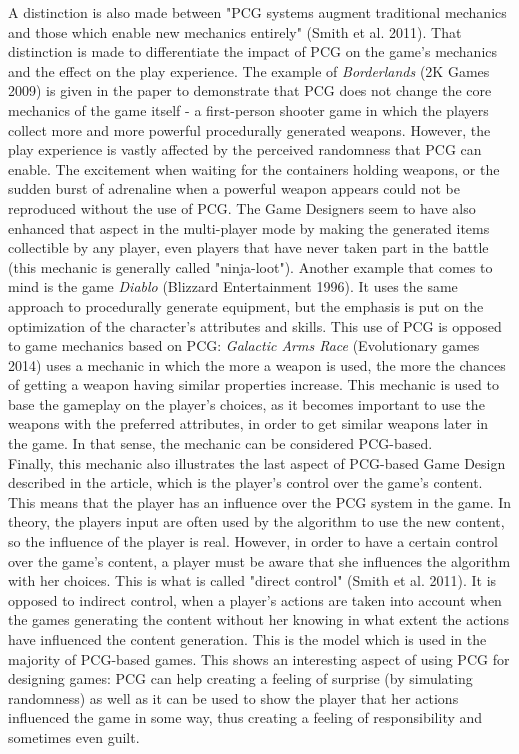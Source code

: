 A distinction is also made between "PCG systems augment traditional mechanics and those which enable new mechanics entirely" (Smith et al. 2011). That distinction is made to differentiate the impact of PCG on the game's mechanics and the effect on the play experience. The example of \textit{Borderlands} (2K Games 2009) is given in the paper to demonstrate that PCG does not change the core mechanics of the game itself - a first-person shooter game in which the players collect more and more powerful procedurally generated weapons. However, the play experience is vastly affected by the perceived randomness that PCG can enable. The excitement when waiting for the containers holding weapons, or the sudden burst of adrenaline when a powerful weapon appears could not be reproduced without the use of PCG. The Game Designers seem to have also enhanced that aspect in the multi-player mode by making the generated items collectible by any player, even players that have never taken part in the battle (this mechanic is generally called "ninja-loot"). Another example that comes to mind is the game \textit{Diablo} (Blizzard Entertainment 1996). It uses the same approach to procedurally generate equipment, but the emphasis is put on the optimization of the character's attributes and skills. This use of PCG is opposed to game mechanics based on PCG: \textit{Galactic Arms Race} (Evolutionary games 2014) uses a mechanic in which the more a weapon is used, the more the chances of getting a weapon having similar properties increase. This mechanic is used to base the gameplay on the player's choices, as it becomes important to use the weapons with the preferred attributes, in order to get similar weapons later in the game. In that sense, the mechanic can be considered PCG-based.\\
Finally, this mechanic also illustrates the last aspect of PCG-based Game Design described in the article, which is the player's control over the game's content. This means that the player has an influence over the PCG system in the game. In theory, the players input are often used by the algorithm to use the new content, so the influence of the player is real. However, in order to have a certain control over the game's content, a player must be aware that she influences the algorithm with her choices. This is what is called "direct control" (Smith et al. 2011). It is opposed to indirect control, when a player's actions are taken into account when the games generating the content without her knowing in what extent the actions have influenced the content generation. This is the model which is used in the majority of PCG-based games. This shows an interesting aspect of using PCG for designing games: PCG can help creating a feeling of surprise (by simulating randomness) as well as it can be used to show the player that her actions influenced the game in some way, thus creating a feeling of responsibility and sometimes even guilt.  

